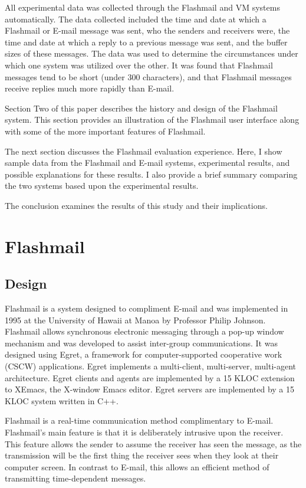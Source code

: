 All experimental data was collected through the Flashmail and VM systems
automatically. The data collected included the time and date at which a
Flashmail or E-mail message was sent, who the senders and receivers were,
the time and date at which a reply to a previous message was sent, and the
buffer sizes of these messages. The data was used to determine the
circumstances under
which one system was utilized over the other.  It was found that Flashmail
messages tend to be short (under 300 characters), and that Flashmail
messages receive replies much more rapidly than E-mail.

Section Two of this paper describes the history and design of the Flashmail
system.  This section provides an illustration of the Flashmail user
interface along with some of the more important features of Flashmail.  

The next section discusses the Flashmail evaluation experience.  Here, I show
sample data from the Flashmail and E-mail systems, experimental results,
and possible explanations for these results.  I also provide a brief
summary comparing the two systems based upon the experimental results. 

The conclusion examines the results of this study and their implications. 

\section{Flashmail}
\subsection{Design}
Flashmail is a system designed to compliment E-mail and was
implemented in 1995 at the University of Hawaii at Manoa by Professor
Philip Johnson.  Flashmail allows synchronous electronic messaging through
a pop-up window mechanism and was developed to assist inter-group
communications.  It was designed using Egret, a framework for
computer-supported cooperative work (CSCW) applications. Egret implements a
multi-client, multi-server, multi-agent architecture. Egret clients and
agents are implemented by a 15 KLOC extension to XEmacs, the X-window Emacs
editor.  Egret servers are implemented by a 15 KLOC system written in C++.
\cite{Egret96}

Flashmail is a real-time communication method complimentary to E-mail.
Flashmail's main feature is that it is deliberately intrusive upon the
receiver.  This feature allows the sender to assume the receiver has seen
the message, as the transmission will be the first thing the receiver sees
when they look at their computer screen.  In contrast to E-mail, this allows
an efficient method of transmitting time-dependent messages.

